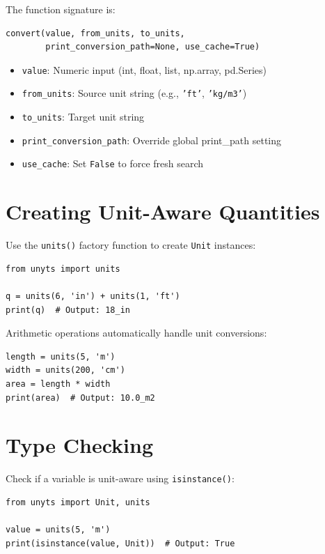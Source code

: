 \documentclass[11pt,a4paper]{report}
\begin{document}
The function signature is:
\begin{lstlisting}[style=pythonstyle]
convert(value, from_units, to_units, 
        print_conversion_path=None, use_cache=True)
\end{lstlisting}

\begin{itemize}[leftmargin=*]
  \item \texttt{value}: Numeric input (int, float, list, np.array, pd.Series)
  \item \texttt{from\_units}: Source unit string (e.g., \texttt{'ft'}, \texttt{'kg/m3'})
  \item \texttt{to\_units}: Target unit string
  \item \texttt{print\_conversion\_path}: Override global print\_path setting
  \item \texttt{use\_cache}: Set \texttt{False} to force fresh search
\end{itemize}

\section{Creating Unit-Aware Quantities}

Use the \texttt{units()} factory function to create \texttt{Unit} instances:

\begin{lstlisting}[style=pythonstyle]
from unyts import units

q = units(6, 'in') + units(1, 'ft')
print(q)  # Output: 18_in
\end{lstlisting}

Arithmetic operations automatically handle unit conversions:

\begin{lstlisting}[style=pythonstyle]
length = units(5, 'm')
width = units(200, 'cm')
area = length * width
print(area)  # Output: 10.0_m2
\end{lstlisting}

\section{Type Checking}

Check if a variable is unit-aware using \texttt{isinstance()}:

\begin{lstlisting}[style=pythonstyle]
from unyts import Unit, units

value = units(5, 'm')
print(isinstance(value, Unit))  # Output: True
\end{lstlisting}
\end{document}
